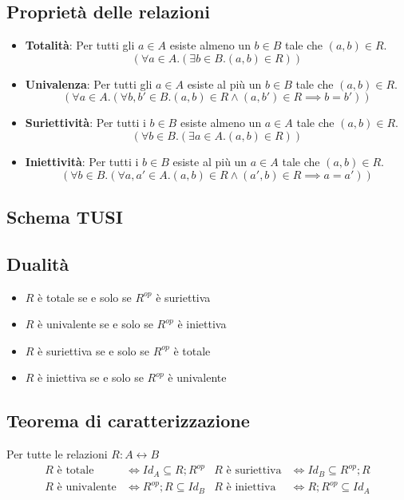 \documentclass{article}
\begin{document}
\subsection{Proprietà delle relazioni}
\begin{itemize}
    \item \textbf{Totalità}: Per tutti gli \(a \in A\) esiste almeno un \(b \in B\) tale che \((a,b) \in R\).
          \[(\forall a \in A . (\exists b \in B . (a,b) \in R))\]
    \item \textbf{Univalenza}: Per tutti gli \(a \in A\) esiste al più un \(b \in B\) tale che \((a,b) \in R\).
          \[(\forall a \in A . (\forall b,b' \in B . (a,b) \in R \land (a,b') \in R \implies b = b'))\]
    \item \textbf{Suriettività}: Per tutti i \(b \in B\) esiste almeno un \(a \in A\) tale che \((a,b) \in R\).
          \[(\forall b \in B . (\exists a \in A . (a,b) \in R))\]
    \item \textbf{Iniettività}: Per tutti i \(b \in B\) esiste al più un \(a \in A\) tale che \((a,b) \in R\).
          \[(\forall b \in B . (\forall a,a' \in A . (a,b) \in R \land (a', b) \in R \implies a = a'))\]
\end{itemize}
\subsection*{Schema TUSI}
\subsection*{Dualità}
\begin{itemize}
    \item \(R\) è totale se e solo se \(R^{op}\) è suriettiva
    \item \(R\) è univalente se e solo se \(R^{op}\) è iniettiva
    \item \(R\) è suriettiva se e solo se \(R^{op}\) è totale
    \item \(R\) è iniettiva se e solo se \(R^{op}\) è univalente
\end{itemize}
\subsection*{Teorema di caratterizzazione}
Per tutte le relazioni \(R: A \leftrightarrow B\)
\begin{align*}
    R \text{ è totale}     & \iff Id_A \subseteq R;R^{op} & R \text{ è suriettiva} & \iff Id_B \subseteq R^{op};R \\
    R \text{ è univalente} & \iff R^{op};R \subseteq Id_B & R \text{ è iniettiva}  & \iff R;R^{op} \subseteq Id_A
\end{align*}
\pagebreak
\end{document}
